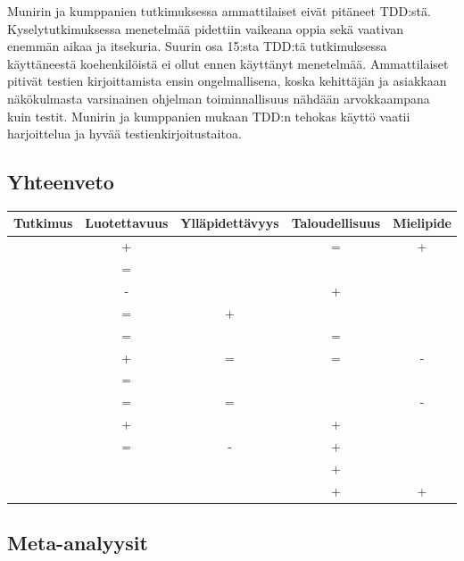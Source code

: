 \documentclass[finnish]{tktltiki2}
\theoremstyle{definition}
\theoremstyle{remark}
\begin{document}
Munirin ja kumppanien \cite{Munir14} tutkimuksessa ammattilaiset eivät pitäneet TDD:stä. Kyselytutkimuksessa menetelmää pidettiin vaikeana oppia sekä vaativan enemmän aikaa ja itsekuria. Suurin osa 15:sta TDD:tä tutkimuksessa käyttäneestä koehenkilöistä ei ollut ennen käyttänyt menetelmää. Ammattilaiset pitivät testien kirjoittamista ensin ongelmallisena, koska kehittäjän ja asiakkaan näkökulmasta varsinainen ohjelman toiminnallisuus nähdään arvokkaampana kuin testit. Munirin ja kumppanien mukaan TDD:n tehokas käyttö vaatii harjoittelua ja hyvää testienkirjoitustaitoa.

\subsection{Yhteenveto}


\begin{tabular}{| l | c | c | c | c |}
\hline
  Tutkimus & Luotettavuus & Ylläpidettävyys & Taloudellisuus & Mielipide \\ \hline
\cite{George04} 	& + &  & = & + \\ \hline
\cite{Wilkerson12} 	& = &  &   &   \\ \hline
\cite{Erdogmus05} 	& - &  	& + &   \\ \hline
\cite{Causevic12} 	& = & + &   &   \\ \hline
\cite{Canfora06} 	& = &  & = &   \\ \hline
\cite{Pancur11} 	& + & = & = & - \\ \hline
\cite{Wilkerson12} 	& = &  &   &   \\ \hline
\cite{Munir14} 	& = & = &   & - \\ \hline
\cite{Nagappan08} 	& + &  & + &   \\ \hline
\cite{Siniaalto07} 	& = & - & + &   \\ \hline
\cite{Madeyski07} 	&   &   & + &   \\ \hline
\cite{Latorre14}	&   &   & + & + \\ \hline
\end{tabular}
  

\subsection{Meta-analyysit}




\end{document}
